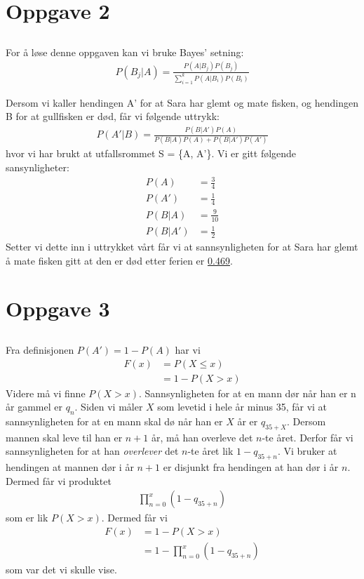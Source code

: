 \documentclass[a4paper,10pt, norsk]{article}
\begin{document}
\section{Oppgave 2}
\subsection{}
For å løse denne oppgaven kan vi bruke Bayes' setning:
\begin{align}
    P(B_j | A) = \frac{P(A|B_j)P(B_j)}{\sum_{i=1}^{k} P(A|B_i)P(B_i)}
\end{align}

Dersom vi kaller hendingen A' for at Sara har glemt og mate fisken, og hendingen B for at gullfisken er død, får vi følgende uttrykk:
\begin{align*}
    P(A'|B)
    = \frac{P(B|A') P(A)}{P(B|A) P(A) + P(B|A') P(A')}
\end{align*}
hvor vi har brukt at utfallsrommet S = \{A, A'\}. Vi er gitt følgende sansynligheter:
\begin{align*}
    P(A) &= \frac{3}{4} \\
    P(A') &= \frac{1}{4} \\
    P(B|A) &= \frac{9}{10} \\
    P(B|A') &= \frac{1}{2}
\end{align*}
Setter vi dette inn i uttrykket vårt får vi at sannsynligheten for at Sara har glemt å mate fisken gitt at den er død etter ferien er \underline{\underline{0.469}}.

\newpage
\section{Oppgave 3}
\subsection{}
Fra definisjonen $P(A') = 1 - P(A)$ har vi
\begin{align*}
    F(x) 
    &= P(X \leq x) \\
    &= 1 - P(X > x)
\end{align*}
Videre må vi finne $P(X > x)$. Sannsynligheten for at en mann dør når han er n år gammel er $q_n$. Siden vi måler $X$ som levetid i hele år minus 35, får vi at sannsynligheten for at en mann skal dø når han er $X$ år er $q_{35+X}$. Dersom mannen skal leve til han er $n+1$ år, må han overleve det $n$-te året. Derfor får vi sannsynligheten for at han \textit{overlever} det $n$-te året lik $1-q_{35+n}$. Vi bruker at hendingen at mannen dør i år $n+1$ er disjunkt fra hendingen at han dør i år $n$. Dermed får vi produktet
\begin{align*}
    \prod_{n=0}^x (1 - q_{35+n})
\end{align*}
som er lik $P(X > x)$. Dermed får vi
\begin{align*}
    F(x)
    &= 1 - P(X > x) \\
    &= 1 - \prod_{n=0}^x (1 - q_{35+n})
\end{align*}
som var det vi skulle vise.
\end{document}
